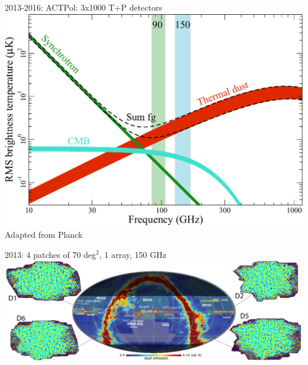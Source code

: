 \documentclass[table]{beamer}
\begin{document}
\begin{frame}{2013-2016: ACTPol: 3x1000 T+P detectors}
	\centering
	\includegraphics[width=\textwidth]{actpol_freqs.pdf}\\
	\footnotesize{Adapted from Planck}
\end{frame}

\begin{frame}{2013: 4 patches of 70 deg${}^2$, 1 array, 150 GHz}
	\centering
	\hspace*{-1cm}\includegraphics[width=1.15\textwidth]{actpol_2013_patches.pdf}
\end{frame}
\end{document}

